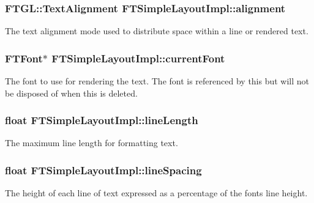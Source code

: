 \subsubsection[{\texorpdfstring{alignment}{alignment}}]{\setlength{\rightskip}{0pt plus 5cm}F\+T\+G\+L\+::\+Text\+Alignment F\+T\+Simple\+Layout\+Impl\+::alignment\hspace{0.3cm}{\ttfamily [private]}}\hypertarget{class_f_t_simple_layout_impl_a0f0edb7cdf27a22fe66f635c56aa0dbd}{}\label{class_f_t_simple_layout_impl_a0f0edb7cdf27a22fe66f635c56aa0dbd}
The text alignment mode used to distribute space within a line or rendered text. 
\subsubsection[{\texorpdfstring{current\+Font}{currentFont}}]{\setlength{\rightskip}{0pt plus 5cm}F\+T\+Font$\ast$ F\+T\+Simple\+Layout\+Impl\+::current\+Font\hspace{0.3cm}{\ttfamily [private]}}\hypertarget{class_f_t_simple_layout_impl_af77c6b00911959673e6e45275bccd128}{}\label{class_f_t_simple_layout_impl_af77c6b00911959673e6e45275bccd128}
The font to use for rendering the text. The font is referenced by this but will not be disposed of when this is deleted. 
\subsubsection[{\texorpdfstring{line\+Length}{lineLength}}]{\setlength{\rightskip}{0pt plus 5cm}float F\+T\+Simple\+Layout\+Impl\+::line\+Length\hspace{0.3cm}{\ttfamily [private]}}\hypertarget{class_f_t_simple_layout_impl_a46da513a479522dd9fe9ab752a761b3e}{}\label{class_f_t_simple_layout_impl_a46da513a479522dd9fe9ab752a761b3e}
The maximum line length for formatting text. 
\subsubsection[{\texorpdfstring{line\+Spacing}{lineSpacing}}]{\setlength{\rightskip}{0pt plus 5cm}float F\+T\+Simple\+Layout\+Impl\+::line\+Spacing\hspace{0.3cm}{\ttfamily [private]}}\hypertarget{class_f_t_simple_layout_impl_a0afb3dda6e096069602a8df941293605}{}\label{class_f_t_simple_layout_impl_a0afb3dda6e096069602a8df941293605}
The height of each line of text expressed as a percentage of the font\textquotesingle{}s line height. 

